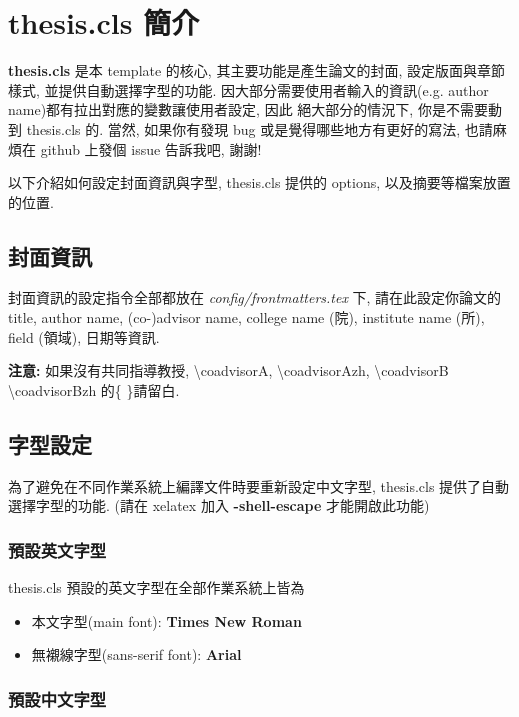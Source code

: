 \chapter{thesis.cls 簡介}
\label{chapter:doccls}

\textbf{thesis.cls} 是本 template 的核心, 其主要功能是產生論文的封面, 設定版面與章節樣式, 並提供自動選擇字型的功能.
因大部分需要使用者輸入的資訊(e.g. author name)都有拉出對應的變數讓使用者設定, 因此
絕大部分的情況下, 你是不需要動到 thesis.cls 的.
當然, 如果你有發現 bug 或是覺得哪些地方有更好的寫法, 也請麻煩在 github 上發個 issue 告訴我吧, 謝謝!

以下介紹如何設定封面資訊與字型, thesis.cls 提供的 options, 以及摘要等檔案放置的位置.

\section{封面資訊}

封面資訊的設定指令全部都放在 \textit{config/frontmatters.tex} 下, 請在此設定你論文的 title, author name, (co-)advisor name, college name (院), institute name (所), field (領域), 日期等資訊.

\textbf{注意:} 如果沒有共同指導教授, \textbackslash coadvisorA, \textbackslash coadvisorAzh, \textbackslash coadvisorB \textbackslash coadvisorBzh 的\{ \}請留白.

\section{字型設定}
\label{sec:fonts}

為了避免在不同作業系統上編譯文件時要重新設定中文字型, thesis.cls 提供了自動選擇字型的功能.
(請在 xelatex 加入 \textbf{-shell-escape} 才能開啟此功能)

\subsection{預設英文字型}

thesis.cls 預設的英文字型在全部作業系統上皆為
\begin{itemize}
\item 本文字型(main font): \textbf{Times New Roman}
\item 無襯線字型(sans-serif font): \textbf{Arial}
\end{itemize}

\subsection{預設中文字型}

